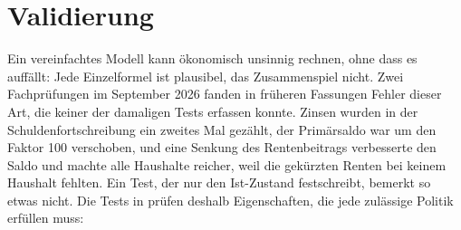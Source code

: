 
\section{Validierung}
\label{sec:validierung}

Ein vereinfachtes Modell kann ökonomisch unsinnig rechnen, ohne dass es
auffällt: Jede Einzelformel ist plausibel, das Zusammenspiel nicht. Zwei
Fachprüfungen im September 2026 fanden in früheren Fassungen Fehler dieser
Art, die keiner der damaligen Tests erfassen konnte. Zinsen wurden in der
Schuldenfortschreibung ein zweites Mal gezählt, der Primärsaldo war um den
Faktor 100 verschoben, und eine Senkung des Rentenbeitrags verbesserte den
Saldo und machte alle Haushalte reicher, weil die gekürzten Renten bei keinem
Haushalt fehlten. Ein Test, der nur den Ist-Zustand festschreibt, bemerkt so
etwas nicht. Die Tests in  prüfen deshalb Eigenschaften, die
jede zulässige Politik erfüllen muss:

